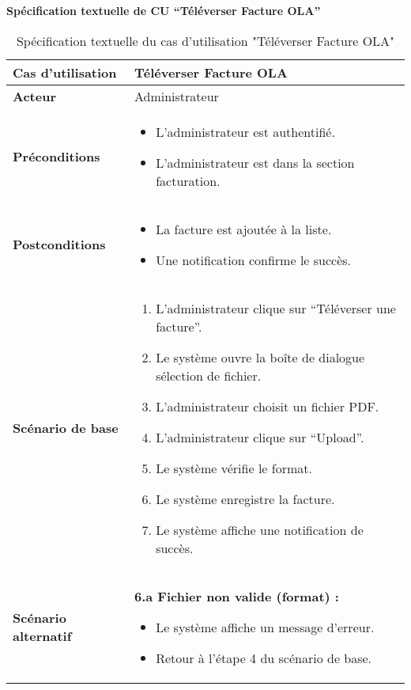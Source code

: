 \documentclass[a4paper,11pt]{report}
\begin{document}
\newpage
\textbf{Spécification textuelle de CU “Téléverser Facture OLA”}
\begin{table}[H]
  \centering
  \renewcommand{\arraystretch}{1.5}
  \caption{Spécification textuelle du cas d'utilisation "Téléverser Facture OLA"}
  \begin{tabularx}{\textwidth}{|l|X|}
    \hline
    \textbf{Cas d'utilisation} & Téléverser Facture OLA \\ \hline
    \textbf{Acteur}            & Administrateur \\ \hline
    \textbf{Préconditions}     & 
      \begin{itemize}
        \item L’administrateur est authentifié.
        \item L'administrateur est dans la section facturation.
      \end{itemize} \\ \hline
    \textbf{Postconditions}    & 
      \begin{itemize}
        \item La facture est ajoutée à la liste.
        \item Une notification confirme le succès.
      \end{itemize} \\ \hline
    \textbf{Scénario de base}  & 
      \begin{enumerate}
        \item L’administrateur clique sur “Téléverser une facture”.
        \item Le système ouvre la boîte de dialogue sélection de fichier.
        \item L'administrateur choisit un fichier PDF.
        \item L'administrateur clique sur “Upload”.
        \item Le système vérifie le format.
        \item Le système enregistre la facture.
        \item Le système affiche une notification de succès.
      \end{enumerate} \\ \hline
    \textbf{Scénario alternatif} & 
      \textbf{6.a Fichier non valide (format) :}
      \begin{itemize}
        \item Le système affiche un message d’erreur.
        \item Retour à l’étape 4 du scénario de base.
      \end{itemize} \\ \hline
  \end{tabularx}
\end{table}
\end{document}
